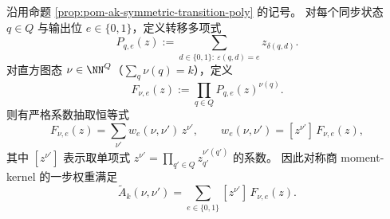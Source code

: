 \begin{corollary}\label{cor:pom-ak-coefficient-extraction}
沿用命题 \ref{prop:pom-ak-symmetric-transition-poly} 的记号。
对每个同步状态 \(q\in Q\) 与输出位 \(e\in\{0,1\}\)，定义转移多项式
\[
P_{q,e}(z):=\sum_{d\in\{0,1\}:\ \varepsilon(q,d)=e} z_{\delta(q,d)}.
\]
对直方图态 \(\nu\in\NN^Q\)（\(\sum_q\nu(q)=k\)），定义
\[
F_{\nu,e}(z):=\prod_{q\in Q}P_{q,e}(z)^{\nu(q)}.
\]
则有严格系数抽取恒等式
\[
F_{\nu,e}(z)=\sum_{\nu'} w_e(\nu,\nu')\,z^{\nu'},
\qquad
w_e(\nu,\nu')=[z^{\nu'}]\,F_{\nu,e}(z),
\]
其中 \([z^{\nu'}]\) 表示取单项式 \(z^{\nu'}=\prod_{q'\in Q} z_{q'}^{\nu'(q')}\) 的系数。
因此对称商 moment-kernel 的一步权重满足
\[
\widetilde A_k(\nu,\nu')=\sum_{e\in\{0,1\}}[z^{\nu'}]\,F_{\nu,e}(z).
\]
\end{corollary}
